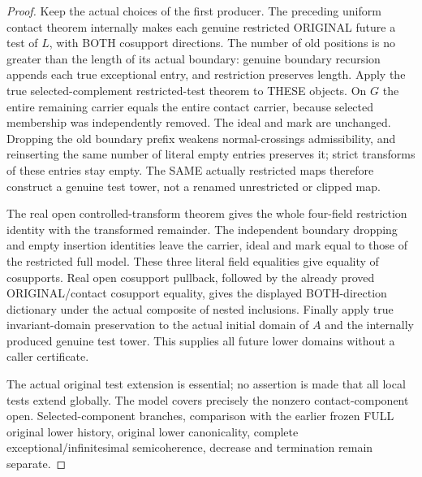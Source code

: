 \begin{proof}
Keep the actual choices of the first producer. The preceding uniform
contact theorem internally makes each genuine restricted ORIGINAL future
a test of $L$, with BOTH cosupport directions. The number of old positions
is no greater than the length of its actual boundary: genuine boundary
recursion appends each true exceptional entry, and restriction preserves
length. Apply the true selected-complement restricted-test theorem to
THESE objects. On $G$ the entire remaining carrier equals the entire
contact carrier, because selected membership was independently removed.
The ideal and mark are unchanged. Dropping the old boundary prefix weakens
normal-crossings admissibility, and reinserting the same number of literal
empty entries preserves it; strict transforms of these entries stay empty.
The SAME actually restricted maps therefore construct a genuine test
tower, not a renamed unrestricted or clipped map.

The real open controlled-transform theorem gives the whole four-field
restriction identity with the transformed remainder. The independent
boundary dropping and empty insertion identities leave the carrier, ideal
and mark equal to those of the restricted full model. These three literal
field equalities give equality of cosupports. Real open cosupport pullback,
followed by the already proved ORIGINAL/contact cosupport equality,
gives the displayed BOTH-direction dictionary under the actual composite
of nested inclusions. Finally apply true invariant-domain preservation to
the actual initial domain of $A$ and the internally produced genuine test
tower. This supplies all future lower domains without a caller certificate.

The actual original test extension is essential; no assertion is made that
all local tests extend globally. The model covers precisely the nonzero
contact-component open. Selected-component branches, comparison with the
earlier frozen FULL original lower history, original lower canonicality,
complete exceptional/infinitesimal semicoherence, decrease and termination
remain separate.
\end{proof}
